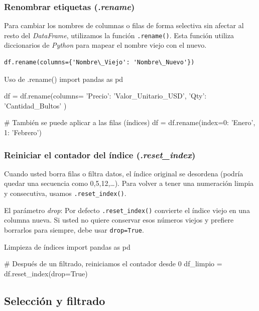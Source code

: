 \subsubsection{Renombrar etiquetas (\textit{.rename})}

Para cambiar los nombres de columnas o filas de forma selectiva sin afectar al resto del \textit{DataFrame}, utilizamos la función \texttt{.rename()}. Esta función utiliza diccionarios de \textit{Python} para mapear el nombre viejo con el nuevo.

\begin{verbatim}
df.rename(columns={'Nombre\_Viejo': 'Nombre\_Nuevo'})
\end{verbatim}

\begin{pycode}{Uso de .rename()}
import pandas as pd

df = df.rename(columns={
'Precio': 'Valor_Unitario_USD',
'Qty': 'Cantidad_Bultos'
})

# También se puede aplicar a las filas (índices)
df = df.rename(index={0: 'Enero', 1: 'Febrero'})
\end{pycode}

\subsubsection{Reiniciar el contador del índice (\textit{.reset\_index})}

Cuando usted borra filas o filtra datos, el índice original se desordena (podría quedar una secuencia como 0,5,12,…). Para volver a tener una numeración limpia y consecutiva, usamos \texttt{.reset\_index()}.

\begin{nota}
El parámetro \textit{drop}: Por defecto \texttt{.reset\_index()} convierte el índice viejo en una columna nueva. Si usted no quiere conservar esos números viejos y prefiere borrarlos para siempre, debe usar \texttt{drop=True}.
\end{nota}

\begin{pycode}{Limpieza de índices}
import pandas as pd

# Después de un filtrado, reiniciamos el contador desde 0
df_limpio = df.reset_index(drop=True)
\end{pycode}



\subsection{Selección y filtrado}

